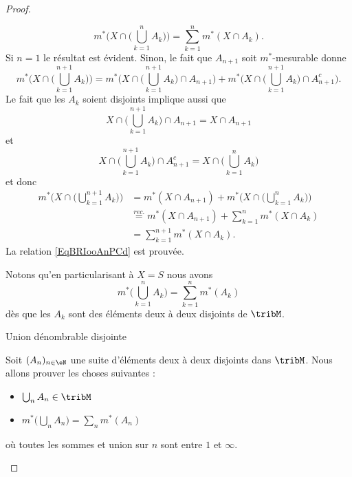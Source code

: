 \begin{proof}
\begin{subproof}
        \begin{equation}    \label{EqBRIooAnPCd}
            m^*\Big( X\cap\big( \bigcup_{k=1}^nA_k \big) \Big)=\sum_{k=1}^nm^*(X\cap A_k).
        \end{equation}
        Si \( n=1\) le résultat est évident. Sinon, le fait que \( A_{n+1}\) soit \( m^*\)-mesurable donne
        \begin{equation}
            m^*\Big( X\cap\big( \bigcup_{k=1}^{n+1}A_k \big) \Big)=m^*\Big( X\cap\big( \bigcup_{k=1}^{n+1}A_k \big)\cap A_{n+1} \Big)+m^*\Big( X\cap\big( \bigcup_{k=1}^{n+1}A_k \big)\cap A_{n+1}^c \Big).
        \end{equation}
        Le fait que les \( A_k\) soient disjoints implique aussi que
        \begin{equation}
            X\cap\big( \bigcup_{k=1}^{n+1}A_k \big)\cap A_{n+1}=X\cap A_{n+1}
        \end{equation}
        et
        \begin{equation}
            X\cap\big( \bigcup_{k=1}^{n+1}A_k \big)\cap A_{n+1}^c=X\cap\big( \bigcup_{k=1}^nA_k \big)
        \end{equation}
        et donc
        \begin{subequations}
            \begin{align}
                m^*\Big( X\cap\big( \bigcup_{k=1}^{n+1}A_k \big) \Big)&=m^*(X\cap A_{n+1})+m^*\Big( X\cap\big( \bigcup_{k=1}^nA_k \big) \Big)\\
                &\stackrel{rec.}{=}m^*(X\cap A_{n+1})+\sum_{k=1}^nm^*(X\cap A_k)\\
                &=\sum_{k=1}^{n+1}m^*(X\cap A_k).
            \end{align}
        \end{subequations}
        La relation \eqref{EqBRIooAnPCd} est prouvée.

        Notons qu'en particularisant à \( X=S\) nous avons
        \begin{equation}
            m^*\big( \bigcup_{k=1}^nA_k \big)=\sum_{k=1}^nm^*(A_k)
        \end{equation}
        dès que les \( A_k\) sont des éléments deux à deux disjoints de \( \tribM\).

    \item[Union dénombrable disjointe]

        Soit \( (A_n)_{n\in \eN}\) une suite d'éléments deux à deux disjoints dans \( \tribM\). Nous allons prouver les choses suivantes :
        \begin{itemize}
            \item \( \bigcup_nA_n\in\tribM\)
            \item \( m^*\big( \bigcup_nA_n \big)=\sum_nm^*(A_n)\)
        \end{itemize}
        où toutes les sommes et union sur \( n\) sont entre \( 1\) et \( \infty\).


\end{subproof}
\end{proof}
